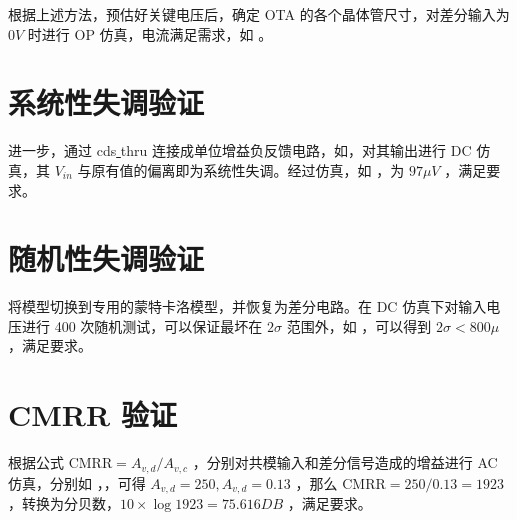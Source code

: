 \documentclass[lang=cn,11pt,a4paper,cite=authoryear]{elegantpaper}
\begin{document}


根据上述方法，预估好关键电压后，确定 OTA 的各个晶体管尺寸，对差分输入为 \(0 V\) 时进行 OP 仿真，电流满足需求，如  。



\section{系统性失调验证}

进一步，通过 cds\underline{ }thru 连接成单位增益负反馈电路，如，对其输出进行 DC 仿真，其 \(V_{in}\) 与原有值的偏离即为系统性失调。经过仿真，如  ，为 \(97 \mu V\) ，满足要求。



\section{随机性失调验证}

将模型切换到专用的蒙特卡洛模型，并恢复为差分电路。在 DC 仿真下对输入电压进行 400 次随机测试，可以保证最坏在 \(2 \sigma\) 范围外，如  ，可以得到 \(2 \sigma < 800 \mu\) ，满足要求。


\section{CMRR 验证}

根据公式 \(\text{CMRR} = A_{v,d}/A_{v,c}\) ，分别对共模输入和差分信号造成的增益进行 AC 仿真，分别如 ，，可得 \(A_{v,d} = 250, A_{v,d} = 0.13\) ，那么 \(\text{CMRR} = 250 / 0.13 = 1923\) ，转换为分贝数，\(10 \times \log 1923 = 75.616 DB\) ，满足要求。



\end{document}
